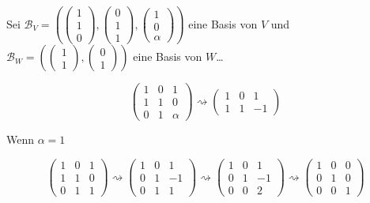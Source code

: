 \documentclass[main.tex]{subfiles}
\begin{document}
Sei $\mathcal{B}_V = \left(\begin{pmatrix}
    1 \\ 1 \\ 0
\end{pmatrix}, \begin{pmatrix}
    0 \\ 1 \\ 1
\end{pmatrix}, \begin{pmatrix}
    1 \\ 0 \\ \alpha
\end{pmatrix}\right)$
eine Basis von $V$ und $\mathcal{B}_W = \left(\begin{pmatrix}
    1 \\ 1
\end{pmatrix}, \begin{pmatrix}
    0 \\ 1
\end{pmatrix}\right)$ eine Basis von $W$…

$$
    \begin{pmatrix}
        1 & 0 & 1 \\
        1 & 1 & 0 \\
        0 & 1 & \alpha
    \end{pmatrix}
    \rightsquigarrow
    \begin{pmatrix}
        1 & 0 & 1 \\
        1 & 1 & -1
    \end{pmatrix}
$$

Wenn $\alpha = 1$

$$
    \begin{pmatrix}
        1 & 0 & 1 \\
        1 & 1 & 0 \\
        0 & 1 & 1
    \end{pmatrix}
    \rightsquigarrow
    \begin{pmatrix}
        1 & 0 & 1 \\
        0 & 1 & -1 \\
        0 & 1 & 1
    \end{pmatrix}
    \rightsquigarrow
    \begin{pmatrix}
        1 & 0 & 1 \\
        0 & 1 & -1 \\
        0 & 0 & 2
    \end{pmatrix}
    \rightsquigarrow
    \begin{pmatrix}
        1 & 0 & 0 \\
        0 & 1 & 0 \\
        0 & 0 & 1
    \end{pmatrix}
$$
\end{document}
